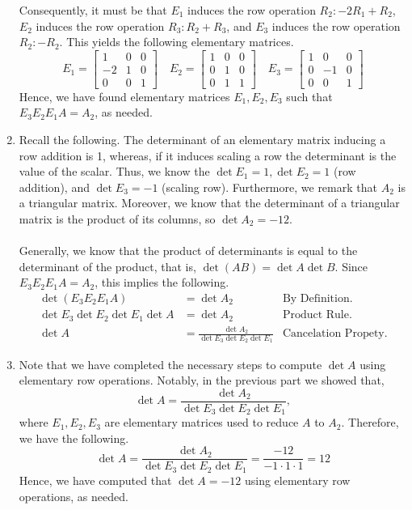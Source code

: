 \begin{SaveQuestion}
\begin{enumerate}
        Consequently, it must be that $E_1$ induces the row operation $R_2: -2R_1 + R_2$, $E_2$ induces the row operation $R_3: R_2 + R_3$, and $E_3$ induces the row operation $R_2: -R_2$. This yields the following elementary matrices.
        $$E_1 = \begin{bmatrix} 1 & 0 & 0 \\ -2 & 1 & 0 \\ 0 & 0 & 1 \end{bmatrix} \quad E_2 = \begin{bmatrix} 1 & 0 & 0 \\ 0 & 1 & 0 \\ 0 & 1 & 1 \end{bmatrix} \quad E_3 = \begin{bmatrix} 1 & 0 & 0 \\ 0 & -1 & 0 \\ 0 & 0 & 1 \end{bmatrix}$$
        Hence, we have found elementary matrices $E_1, E_2, E_3$ such that $E_3 E_2 E_1 A = A_2$, as needed.
        
        \item Recall the following. The determinant of an elementary matrix inducing a row addition is 1, whereas, if it induces scaling a row the determinant is the value of the scalar. Thus, we know the $\det E_1 = 1, \det E_2 = 1$ (row addition), and $\det E_3 = -1$ (scaling row). Furthermore, we remark that $A_2$ is a triangular matrix. Moreover, we know that the determinant of a triangular matrix is the product of its columns, so $\det A_2 = -12$. \\ \\ 
        Generally, we know that the product of determinants is equal to the determinant of the product, that is, $\det(AB) = \det A \det B$.  Since $E_3 E_2 E_1 A = A_2$, this implies the following.
        \begin{align*}
            \det(E_3 E_2 E_1 A)                 &= \det A_2                                     &\text{By Definition.} \\
            \det E_3 \det E_2 \det E_1 \det A   &= \det A_2                                     &\text{Product Rule.} \\
            \det A                              &= \frac{\det A_2}{\det E_3 \det E_2 \det E_1}  &\text{Cancelation Propety.}
        \end{align*}

        \item Note that we have completed the necessary steps to compute $\det A$ using elementary row operations. Notably, in the previous part we showed that,
        $$\det A = \frac{\det A_2}{\det E_3 \det E_2 \det E_1},$$
        where $E_1, E_2, E_3$ are elementary matrices used to reduce $A$ to $A_2$. Therefore, we have the following.
        $$\det A = \frac{\det A_2}{\det E_3 \det E_2 \det E_1} = \frac{-12}{-1 \cdot 1 \cdot 1} = 12$$
        Hence, we have computed that $\det A = -12$ using elementary row operations, as needed. 
    \end{enumerate}
\end{SaveQuestion}

